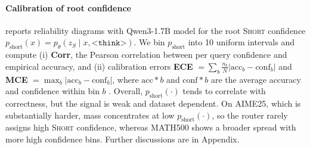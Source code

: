 \paragraph{Calibration of root confidence}
 reports reliability diagrams with Qwen3-1.7B model for the root \textsc{Short} confidence $p_{\mathrm{short}}(x){=}p_\theta(z_S{\mid}x,\texttt{<think>})$. We bin $p_{\mathrm{short}}$ into 10 uniform intervals and compute (i) \textbf{Corr}, the Pearson correlation between per query confidence and empirical accuracy, and (ii) calibration errors \textbf{ECE} $=\sum_b \frac{n_b}{N}\lvert \mathrm{acc}_b-\mathrm{conf}_b\rvert$ and \textbf{MCE} $=\max_b \lvert \mathrm{acc}_b-\mathrm{conf}_b\rvert$, where $\mathrm{acc}*b$ and $\mathrm{conf}*b$ are the average accuracy and confidence within bin $b$ \cite{guo2017calibration}. Overall, $p_{\mathrm{short}}(\cdot)$ tends to correlate with correctness, but the signal is weak and dataset dependent. On AIME25, which is substantially harder, mass concentrates at low $p_{\mathrm{short}}(\cdot)$, so the router rarely assigns high \textsc{Short} confidence, whereas MATH500 shows a broader spread with more high confidence bins. 
Further discussions are in Appendix.

